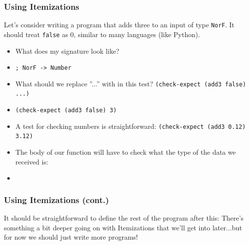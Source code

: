 \documentclass{beamer}
\begin{document}


\begin{frame}
  \frametitle{Using Itemizations}
  Let's consider writing a program that adds three to an input
  of type \texttt{NorF}. It should treat \texttt{false}
  as 0, similar to many languages (like Python).
  \begin{itemize}
  \item<2-> What does my signature look like?
  \item<3-> \texttt{; NorF -> Number}
  \item<4-> What should we replace ''...'' with in this test?
    \texttt{(check-expect (add3 false) ...)}
  \item<5-> \texttt{(check-expect (add3 false) 3)}
  \item<6-> A test for checking numbers is straightforward:
    \texttt{(check-expect (add3 0.12) 3.12)}
  \item<7-> The body of our function will have to check what the type
    of the data we received is:
  \item<8-> \condAdd
  \end{itemize}
\end{frame}

\begin{frame}
  \frametitle{Using Itemizations (cont.)}
  It should be straightforward to define the rest of the program after this:
  \pause
  \addThree
  \pause
  There's something a bit deeper going on with Itemizations that we'll
  get into later...but for now we should just write more programs!
\end{frame}

\end{document}
